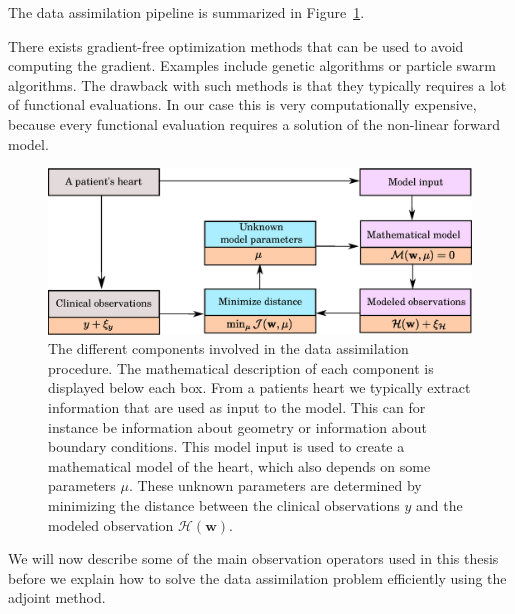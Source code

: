 The data assimilation pipeline is summarized in
Figure~\ref{fig:data_assimilation}. 

\begin{remark}
  There exists gradient-free optimization methods that can be used to
  avoid computing the gradient. Examples include genetic algorithms or
  particle swarm algorithms. The drawback with such methods is that
  they typically requires a lot of functional evaluations. In our
  case this is very computationally expensive, because every functional
  evaluation requires a solution of the non-linear forward model. 
\end{remark}


\begin{figure}[htbp]
  \centering
    \includegraphics[width=\textwidth]{chapters/introduction/figures/data_assimilation.eps}
\caption{The different components involved in the data assimilation
  procedure. The mathematical description of each component is
  displayed below each box. From a patients heart we typically extract information
  that are used as input to the model. This can for instance be
  information about geometry or information about boundary
  conditions. This model input is used to create a mathematical model
  of the heart, which also depends on some parameters $\mu$.
  These unknown parameters are determined by minimizing the distance
  between the clinical observations $y$ and the modeled observation
  $\mathcal{H}(\mathbf{w})$.}
\label{fig:data_assimilation}
\end{figure}

We will now describe some of the main observation operators used in
this thesis before we explain how to solve the data assimilation
problem efficiently using the adjoint method. 


